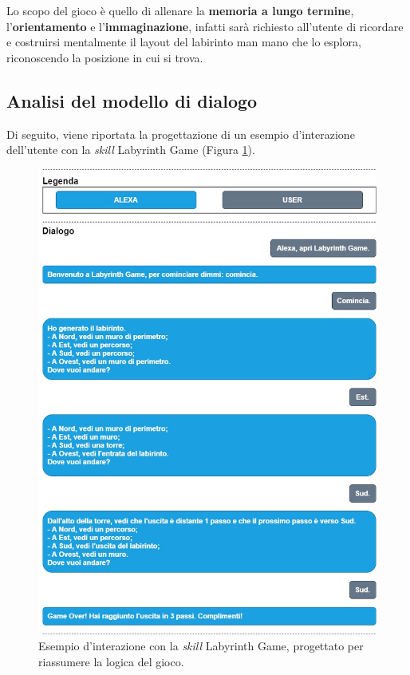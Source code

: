 Lo scopo del gioco è quello di allenare la \textbf{memoria a lungo termine},
l’\textbf{orientamento} e l’\textbf{immaginazione}, infatti sarà richiesto
all’utente di ricordare e costruirsi mentalmente il layout del labirinto man
mano che lo esplora, riconoscendo la posizione in cui si trova.

\subsection{Analisi del modello di dialogo}
\label{subsec:Sezione4.3.1}

Di seguito, viene riportata la progettazione di un esempio d'interazione
dell’utente con la \textit{skill} Labyrinth Game (Figura \ref{fig:figure4.7}).
\newpage

\begin{figure}[!ht]
  \centering
  \includegraphics[scale=0.5]{resources/images/analysis/skill-flow-example/labyrinth-game-flow-example.jpg}
  \caption{
    Esempio d'interazione con la \textit{skill} Labyrinth Game, progettato per
    riassumere la logica del gioco.
  }
  \label{fig:figure4.7}
\end{figure}
\newpage

